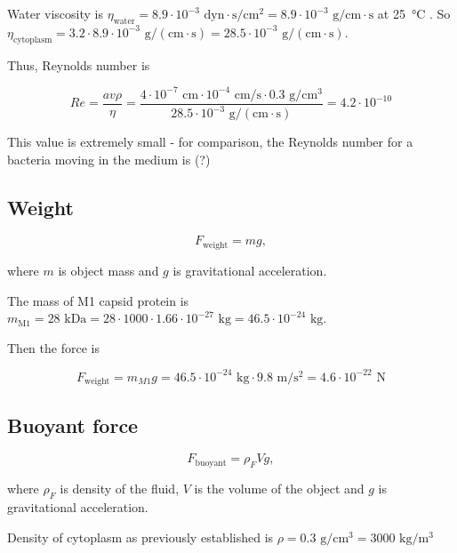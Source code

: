 Water viscosity is $\eta_\text{water} = 8.9 \cdot 10^{-3} \text{ dyn} \cdot \text{s}/\text{cm}^2 = 8.9 \cdot 10^{-3} \text{ g}/\text{cm} \cdot \text{s} $ at \SI{25}{\degreeCelsius} \cite{IAPWS2008}. So $\eta_\text{cytoplasm} = 3.2 \cdot 8.9 \cdot 10^{-3} \text{ g}/(\text{cm} \cdot \text{s}) = 28.5 \cdot 10^{-3} \text{ g}/(\text{cm} \cdot \text{s})$.

Thus, Reynolds number is

\begin{equation}
Re = \frac{av\rho}{\eta} = \frac{4 \cdot 10^{-7} \text{ cm} \cdot 10^{-4} \text{ cm/s} \cdot 0.3 \text{ g}/\text{cm}^3}{28.5 \cdot 10^{-3} \text{ g}/(\text{cm} \cdot \text{s})} = 4.2 \cdot 10^{-10}
\end{equation}

This value is extremely small - for comparison, the Reynolds number for a bacteria moving in the medium is (?)

\subsection{Weight}

\begin{equation}
F_{\text{weight}} = mg,
\end{equation}

where $m$ is object mass and $g$ is gravitational acceleration.

The mass of M1 capsid protein is $m_{\text{M1}} = 28 \text{ kDa} = 28 \cdot 1000 \cdot 1.66 \cdot 10^{-27} \text{ kg} = 46.5 \cdot 10^{-24} \text{ kg}$. \cite{shtykova2013structural}

Then the force is

\begin{equation}
F_{\text{weight}} = m_{M1}g = 46.5 \cdot 10^{-24} \text{ kg} \cdot 9.8 \text{ m}/\text{s}^2 = 4.6 \cdot 10^{-22} \text{ N}
\end{equation}

\subsection{Buoyant force}

\begin{equation}
F_{\text{buoyant}} = \rho_FVg,
\end{equation}

where $\rho_F$ is density of the fluid, $V$ is the volume of the object and $g$ is gravitational acceleration.

Density of cytoplasm as previously established is $\rho = 0.3 \text{ g}/\text{cm}^3 = 3000 \text{ kg}/\text{m}^3$ \cite{hartmann1967cytoplasmic}

